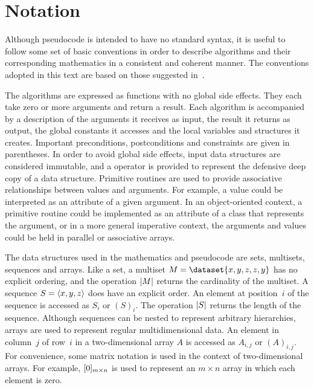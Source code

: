 \chapter{Notation}
\label{app:notation}

Although pseudocode is intended to have no standard syntax, it is useful to follow some set of basic conventions in order to describe algorithms and their corresponding mathematics in a consistent and coherent manner.
The conventions adopted in this text are based on those suggested in~\citep{smed06}.

The algorithms are expressed as functions with no global side effects.
They each take zero or more arguments and return a result.
Each algorithm is accompanied by a description of the arguments it receives as input, the result it returns as output, the global constants it accesses and the local variables and structures it creates.
Important preconditions, postconditions and constraints are given in parentheses.
In order to avoid global side effects, input data structures are considered immutable, and a \Copy{} operator is provided to represent the defensive deep copy of a data structure.
Primitive routines are used to provide associative relationships between values and arguments.
For example, a value could be interpreted as an attribute of a given argument.
In an object-oriented context, a primitive routine could be implemented as an attribute of a class that represents the argument, or in a more general imperative context, the arguments and values could be held in parallel or associative arrays.

The data structures used in the mathematics and pseudocode are sets, multisets, sequences and arrays.
Like a set, a multiset \( M = \dataset{x, y, z, z, y} \) has no explicit ordering, and the operation \( \lvert M\rvert \) returns the cardinality of the multiset.
A sequence \( S = \langle x, y, z\rangle \) does have an explicit order.
An element at position~\( i \) of the sequence is accessed as \( S_{i} \) or \( (S)_{i} \).
The operation \( \lvert S\rvert \) returns the length of the sequence.
Although sequences can be nested to represent arbitrary hierarchies, arrays are used to represent regular multidimensional data.
An element in column~\( j \) of row~\( i \) in a two-dimensional array \( A \) is accessed as \( A_{i, j} \) or \( (A)_{i, j} \).
For convenience, some matrix notation is used in the context of two-dimensional arrays.
For example, \( \lbrack0\rbrack_{m \times n} \) is used to represent an \( m \times n \) array in which each element is zero.

